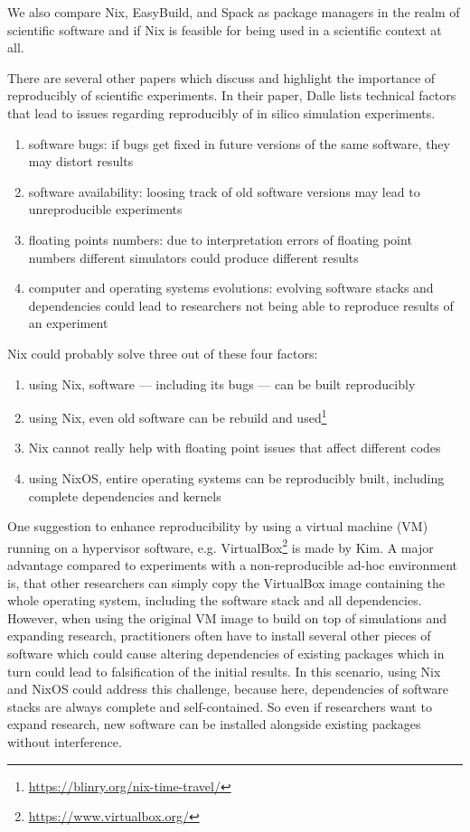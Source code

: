 \documentclass[conference,final,a4paper]{IEEEtran}
\begin{document}
We also compare Nix, EasyBuild, and Spack as package managers in the realm of scientific software and if Nix is feasible for being used in a scientific context at all.

There are several other papers which discuss and highlight the importance of reproducibly of scientific experiments.
In their paper, Dalle lists technical factors that lead to issues regarding reproducibly of in silico simulation experiments.\cite{Dalle_2012}
\begin{enumerate}
    \item software bugs: if bugs get fixed in future versions of the same software, they may distort results
    \item software availability: loosing track of old software versions may lead to unreproducible experiments
    \item floating points numbers: due to interpretation errors of floating point numbers different simulators could produce different results
    \item computer and operating systems evolutions: evolving software stacks and dependencies could lead to researchers not being able to reproduce results of an experiment
\end{enumerate}
Nix could probably solve three out of these four factors:
\begin{enumerate}
    \item using Nix, software --- including its bugs --- can be built reproducibly
    \item using Nix, even old software can be rebuild and used\footnote{\url{https://blinry.org/nix-time-travel/}}
    \item Nix cannot really help with floating point issues that affect different codes
    \item using NixOS, entire operating systems can be reproducibly built, including complete dependencies and kernels
\end{enumerate}

One suggestion to enhance reproducibility by using a virtual machine (VM) running on a hypervisor software, e.g. VirtualBox\footnote{\url{https://www.virtualbox.org/}} is made by Kim.\cite{Kim_2019}
A major advantage compared to experiments with a non-reproducible ad-hoc environment is, that other researchers can simply copy the VirtualBox image containing the whole operating system, including the software stack and all dependencies.
However, when using the original VM image to build on top of simulations and expanding research, practitioners often have to install several other pieces of software which could cause altering dependencies of existing packages which in turn could lead to falsification of the initial results.
In this scenario, using Nix and NixOS could address this challenge, because here, dependencies of software stacks are always complete and self-contained.
So even if researchers want to expand research, new software can be installed alongside existing packages without interference.
\end{document}
